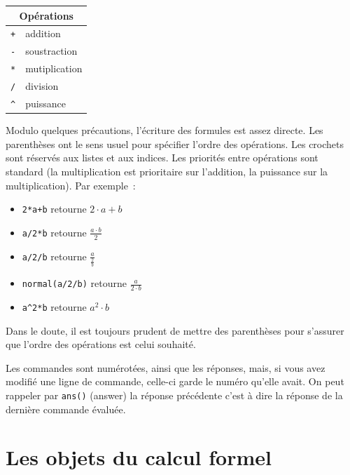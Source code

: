 \documentclass{article}
\begin{document}
\begin{center}
\begin{tabular}{|ll|}
\hline
\multicolumn{2}{|c|}{\bf Op\'erations}\\
\hline\hline
\verb|+|& addition\\
\verb|-|& soustraction \\
\verb|*|& mutiplication  \\
\verb|/|& division\\
\verb|^|& puissance  \\
\hline
\end{tabular}
\end{center}

Modulo quelques pr\'ecautions, l'\'ecriture des formules est assez
directe. Les parenth\`eses ont le sens 
usuel pour sp\'ecifier l'ordre des op\'erations. Les crochets 
sont r\'eserv\'es aux listes et aux indices.
Les priorit\'es entre op\'erations sont standard 
(la multiplication est prioritaire sur l'addition, la puissance sur
la multiplication). Par exemple~:
%
\begin{itemize}
\item
\verb|2*a+b| retourne $2\cdot a+b$
\item
\verb|a/2*b| retourne $\displaystyle \frac{a\cdot b}{2}$\\
\item
\verb|a/2/b| retourne $\displaystyle \frac{a}{\displaystyle \frac{2}{b}}$
\item
\verb|normal(a/2/b)| retourne $\displaystyle \frac{a}{2\cdot b}$
\item
\verb|a^2*b| retourne $a^2\cdot b$
\end{itemize}
Dans le doute, il est toujours prudent de mettre des parenth\`eses 
pour s'assurer que l'ordre des op\'erations est celui souhait\'e.

Les commandes sont num\'erot\'ees, ainsi que les r\'eponses,
mais, si vous avez modifi\'e une ligne de commande, celle-ci
garde le num\'ero qu'elle avait. On peut rappeler par \verb|ans()| (answer) la 
r\'eponse pr\'ec\'edente c'est \`a dire la r\'eponse de la derni\`ere commande
\'evalu\'ee.
%
\section{Les objets du calcul formel}
%
\end{document}
